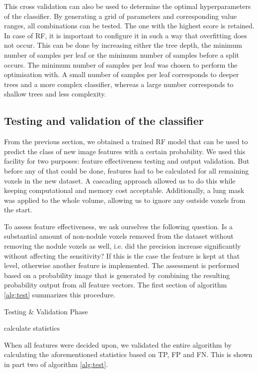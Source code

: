 This cross validation can also be used to determine the optimal hyperparameters
of the classifier. By generating a grid of parameters and corresponding value
ranges, all combinations can be tested. The one with the highest score is
retained. In case of RF, it is important to configure it in such a way that
overfitting does not occur. This can be done by increasing either the tree
depth, the minimum number of samples per leaf or the minimum number of samples
before a split occurs. The minimum number of samples per leaf was chosen to
perform the optimisation with. A small number of samples per leaf corresponds to
deeper trees and a more complex classifier, whereas a large number corresponds
to shallow trees and less complexity.

\subsection{Testing and validation of the classifier}
From the previous section, we obtained a trained RF model that can be used to
predict the class of new image features with a certain probability. We used this
facility for two purposes: feature effectiveness testing and output validation.
But before any of that could be done, features had to be calculated for all
remaining voxels in the new dataset. A cascading approach allowed us to do this
while keeping computational and memory cost acceptable. Additionally, a lung mask
was applied to the whole volume, allowing us to ignore any outside voxels from
the start.

To assess feature effectiveness, we ask ourselves the following question. Is a
substantial amount of non-nodule voxels removed from the dataset without
removing the nodule voxels as well, i.e. did the precision increase
significantly without affecting the sensitivity? If this is the case the feature
is kept at that level, otherwise another feature is implemented. The assessment
is performed based on a probability image that is generated by combining the
resulting probability output from all feature vectors. The first section of
algorithm \ref{alg:test} summarizes this procedure.

\begin{algorithm}[ht]
	\DontPrintSemicolon
	\caption{Testing \& Validation Phase\label{alg:test}}
	calculate statistics
\end{algorithm}

When all features were decided upon, we validated the entire algorithm by 
calculating the aforementioned statistics based on TP, FP and FN. This is 
shown in part two of algorithm \ref{alg:test}.